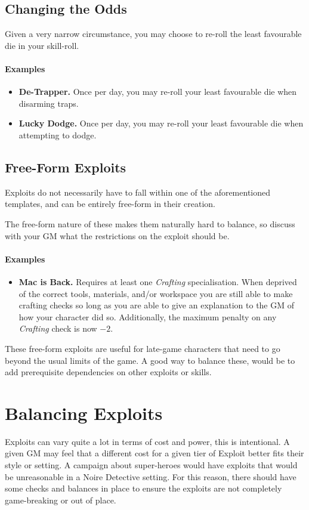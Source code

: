 \subsection{Changing the Odds}
Given a very narrow circumstance, you may choose to re-roll the least favourable die in your skill-roll.
\paragraph{Examples}
\begin{itemize}
    \item \textbf{De-Trapper.} Once per day, you may re-roll your least favourable die when disarming traps.
    \item \textbf{Lucky Dodge.} Once per day, you may re-roll your least favourable die when attempting to dodge.
\end{itemize}

\subsection{Free-Form Exploits}
Exploits do not necessarily have to fall within one of the aforementioned templates, and can be entirely free-form in their creation.

The free-form nature of these makes them naturally hard to balance, so discuss with your GM what the restrictions on the exploit should be.

\paragraph{Examples}
\begin{itemize}
    \item \textbf{Mac is Back.} Requires at least one \textit{Crafting} specialisation.
    When deprived of the correct tools, materials, and/or workspace you are still able to make crafting checks so long as you are able to give an explanation to the GM of how your character did so.
Additionally, the maximum penalty on any \textit{Crafting} check is now $-2$.
\end{itemize}

These free-form exploits are useful for late-game characters that need to go beyond the usual limits of the game. A good way to balance these, would be to add prerequisite dependencies on other exploits or skills.

\section{Balancing Exploits}\label{sec:exploit-balance}
Exploits can vary quite a lot in terms of cost and power, this is intentional. 
A given GM may feel that a different cost for a given tier of Exploit better fits their style or setting.
A campaign about super-heroes would have exploits that would be unreasonable in a Noire Detective setting.
For this reason, there should have some checks and balances in place to ensure the exploits are not completely game-breaking or out of place.

